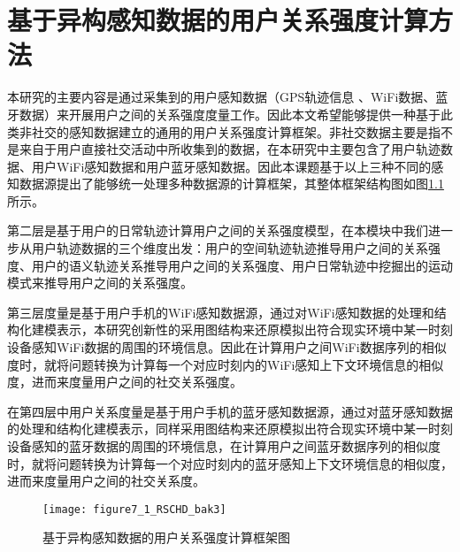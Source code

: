 \chapter{基于异构感知数据的用户关系强度计算方法}
\label{chap:chapter04}
本研究的主要内容是通过采集到的用户感知数据（GPS轨迹信息 、WiFi数据、蓝牙数据）来开展用户之间的关系强度度量工作。因此本文希望能够提供一种基于此类非社交的感知数据建立的通用的用户关系强度计算框架。非社交数据主要是指不是来自于用户直接社交活动中所收集到的数据，在本研究中主要包含了用户轨迹数据、用户WiFi感知数据和用户蓝牙感知数据。因此本课题基于以上三种不同的感知数据源提出了能够统一处理多种数据源的计算框架，其整体框架结构图如图\ref{fig:7_1}所示。
\par 第二层是基于用户的日常轨迹计算用户之间的关系强度模型，在本模块中我们进一步从用户轨迹数据的三个维度出发：用户的空间轨迹轨迹推导用户之间的关系强度、用户的语义轨迹关系推导用户之间的关系强度、用户日常轨迹中挖掘出的运动模式来推导用户之间的关系强度。
\par 第三层度量是基于用户手机的WiFi感知数据源，通过对WiFi感知数据的处理和结构化建模表示，本研究创新性的采用图结构来还原模拟出符合现实环境中某一时刻设备感知WiFi数据的周围的环境信息。因此在计算用户之间WiFi数据序列的相似度时，就将问题转换为计算每一个对应时刻内的WiFi感知上下文环境信息的相似度，进而来度量用户之间的社交关系强度。
\par 在第四层中用户关系度量是基于用户手机的蓝牙感知数据源，通过对蓝牙感知数据的处理和结构化建模表示，同样采用图结构来还原模拟出符合现实环境中某一时刻设备感知的蓝牙数据的周围的环境信息，在计算用户之间蓝牙数据序列的相似度时，就将问题转换为计算每一个对应时刻内的蓝牙感知上下文环境信息的相似度，进而来度量用户之间的社交关系度。
\begin{figure}[htp]
\centering
\texttt{[image: figure7\_1\_RSCHD\_bak3]}
\caption{基于异构感知数据的用户关系强度计算框架图}
\label{fig:7_1}
\end{figure}

